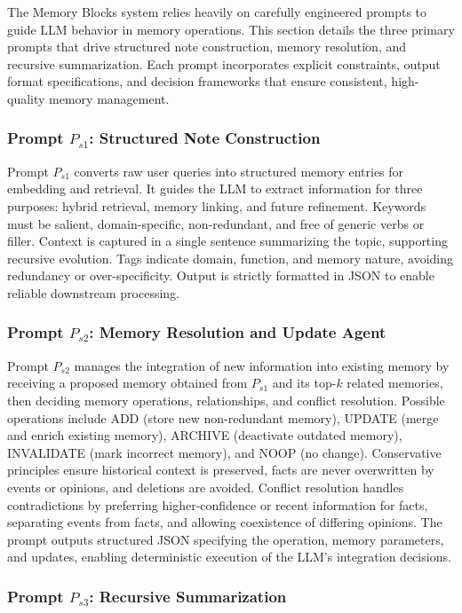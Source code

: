 ﻿\documentclass[12pt,a4paper]{article}
\begin{document}
The Memory Blocks system relies heavily on carefully engineered prompts to guide LLM behavior in memory operations. This section details the three primary prompts that drive structured note construction, memory resolution, and recursive summarization. Each prompt incorporates explicit constraints, output format specifications, and decision frameworks that ensure consistent, high-quality memory management.

\subsubsection{Prompt $P_{s1}$: Structured Note Construction}

Prompt $P_{s1}$ converts raw user queries into structured memory entries for embedding and retrieval. It guides the LLM to extract information for three purposes: hybrid retrieval, memory linking, and future refinement. Keywords must be salient, domain-specific, non-redundant, and free of generic verbs or filler. Context is captured in a single sentence summarizing the topic, supporting recursive evolution. Tags indicate domain, function, and memory nature, avoiding redundancy or over-specificity. Output is strictly formatted in JSON to enable reliable downstream processing.

\subsubsection{Prompt $P_{s2}$: Memory Resolution and Update Agent}

Prompt $P_{s2}$ manages the integration of new information into existing memory by receiving a proposed memory obtained from $P_{s1}$ and its top-$k$ related memories, then deciding memory operations, relationships, and conflict resolution. Possible operations include ADD (store new non-redundant memory), UPDATE (merge and enrich existing memory), ARCHIVE (deactivate outdated memory), INVALIDATE (mark incorrect memory), and NOOP (no change). Conservative principles ensure historical context is preserved, facts are never overwritten by events or opinions, and deletions are avoided. Conflict resolution handles contradictions by preferring higher-confidence or recent information for facts, separating events from facts, and allowing coexistence of differing opinions. The prompt outputs structured JSON specifying the operation, memory parameters, and updates, enabling deterministic execution of the LLM's integration decisions.

\subsubsection{Prompt $P_{s3}$: Recursive Summarization}
\end{document}
